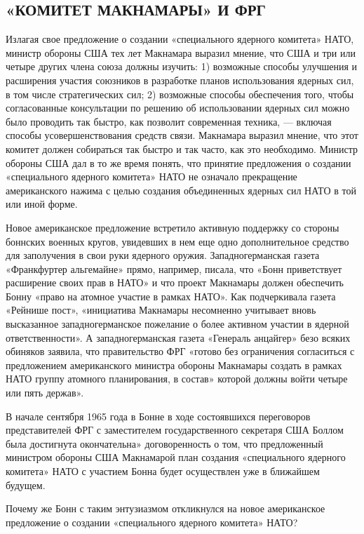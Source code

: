 \documentclass[12pt, a4paper, openany]{book}
\begin{document}
		\subsection[«Комитет Макнамары» И ФРГ]{\center «КОМИТЕТ МАКНАМАРЫ» И ФРГ}	
	
	Излагая свое предложение о создании «специального ядерного комитета» НАТО, министр обороны США тех лет Макнамара выразил мнение, что США и три или четыре других члена союза должны изучить: 1) возможные способы улучшения и расширения участия союзников в разработке планов использования ядерных сил, в том числе стратегических сил; 2) возможные способы обеспечения того, чтобы согласованные консультации по решению об использовании ядерных сил можно было проводить так быстро, как позволит современная техника, — включая способы усовершенствования средств связи. Макнамара выразил мнение, что этот комитет должен собираться так быстро и так часто, как это необходимо. Министр обороны США дал в то же время понять, что принятие предложения о создании «специального ядерного комитета» НАТО не означало прекращение американского нажима с целью создания объединенных ядерных сил НАТО в той или иной форме.
	
	
	Новое американское предложение встретило активную поддержку со стороны боннских военных кругов, увидевших в нем еще одно дополнительное средство для заполучения в свои руки ядерного оружия. Западногерманская газета «Франкфуртер альгемайне» прямо, например, писала, что «Бонн приветствует расширение своих прав в НАТО» и что проект Макнамары должен обеспечить Бонну «право на атомное участие в рамках НАТО». Как подчеркивала газета «Рейнише пост», «инициатива Макнамары несомненно учитывает вновь высказанное западногерманское пожелание о более активном участии в ядерной ответственности». А западногерманская газета «Генераль анцайгер» безо всяких обиняков заявила, что правительство ФРГ «готово без ограничения согласиться с предложением американского министра обороны Макнамары создать в рамках НАТО группу атомного планирования, в состав» которой должны войти четыре или пять держав».
	
	В начале сентября 1965 года в Бонне в ходе состоявшихся переговоров представителей ФРГ с заместителем государственного секретаря США Боллом была достигнута окончательна» договоренность о том, что предложенный министром обороны США Макнамарой план создания «специального ядерного комитета» НАТО с участием Бонна будет осуществлен уже в ближайшем будущем.
	
	Почему же Бонн с таким энтузиазмом откликнулся на новое американское предложение о создании «специального ядерного комитета» НАТО?
	
\end{document}
